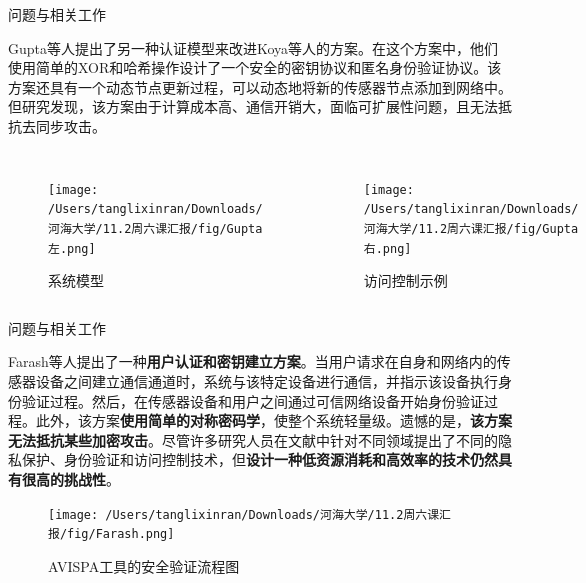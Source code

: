 \documentclass{beamer}
\begin{document}
\begin{frame}{问题与相关工作}
    \footnotesize  %

    Gupta等人提出了另一种认证模型来改进Koya等人的方案。在这个方案中，他们使用简单的XOR和哈希操作设计了一个安全的密钥协议和匿名身份验证协议。该方案还具有一个动态节点更新过程，可以动态地将新的传感器节点添加到网络中。但研究发现，该方案由于计算成本高、通信开销大，面临可扩展性问题，且无法抵抗去同步攻击。

    \vspace{0.5cm}  %
    \begin{columns}
        \begin{figure}
            \centering
            \texttt{[image: /Users/tanglixinran/Downloads/河海大学/11.2周六课汇报/fig/Gupta左.png]}
            \caption{系统模型}
        \end{figure}

        \begin{figure}
            \centering
            \texttt{[image: /Users/tanglixinran/Downloads/河海大学/11.2周六课汇报/fig/Gupta右.png]}
            \caption{访问控制示例}
        \end{figure}
    \end{columns}

\end{frame}

\begin{frame}{问题与相关工作}
    \footnotesize  %

    Farash等人提出了一种\textbf{用户认证和密钥建立方案}。当用户请求在自身和网络内的传感器设备之间建立通信通道时，系统与该特定设备进行通信，并指示该设备执行身份验证过程。然后，在传感器设备和用户之间通过可信网络设备开始身份验证过程。此外，该方案\textbf{使用简单的对称密码学}，使整个系统轻量级。遗憾的是，\textbf{该方案无法抵抗某些加密攻击}。尽管许多研究人员在文献中针对不同领域提出了不同的隐私保护、身份验证和访问控制技术，但\textbf{设计一种低资源消耗和高效率的技术仍然具有很高的挑战性}。

    \begin{figure}[htbp]
        \centering
        \texttt{[image: /Users/tanglixinran/Downloads/河海大学/11.2周六课汇报/fig/Farash.png]} %
        \caption{AVISPA工具的安全验证流程图}
    \end{figure}
\end{frame}
\end{document}
